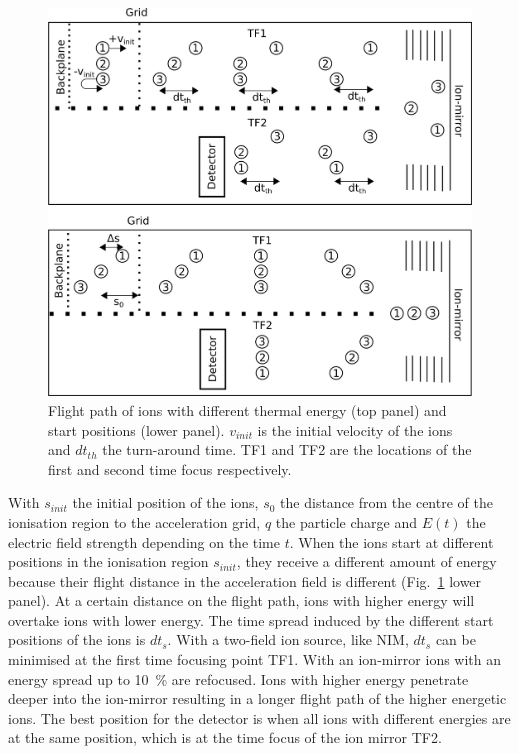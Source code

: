 	\begin{figure}[H] %
		\centering
		\includegraphics[width= .9\textwidth]{Bilder/ISStartPosThermEn.png}
		\caption{Flight path of ions with different thermal energy (top panel) and start positions (lower panel). $v_{init}$ is the initial velocity of the ions and $dt_{th}$ the turn-around time. TF1 and TF2 are the locations of the first and second time focus respectively.}
		\label{fig:thISStartPosThermEn}
	\end{figure}

	With $s_{init}$ the initial position of the ions, $s_0$ the distance from the centre of the ionisation region to the acceleration grid, $q$ the particle charge and $E(t)$ the electric field strength depending on the time $t$. When the ions start at different positions in the ionisation region $s_{init}$, they receive a different amount of energy because their flight distance in the acceleration field is different (Fig.~\ref{fig:thISStartPosThermEn} lower panel). At a certain distance on the flight path, ions with higher energy will overtake ions with lower energy. The time spread induced by the different start positions of the ions is $dt_{s}$. With a two-field ion source, like NIM, $dt_s$ can be minimised at the first time focusing point TF1. With an ion-mirror ions with an energy spread up to 10~\% are refocused. Ions with higher energy penetrate deeper into the ion-mirror resulting in a longer flight path of the higher energetic ions. The best position for the detector is when all ions with different energies are at the same position, which is at the time focus of the ion mirror TF2.\\
	

